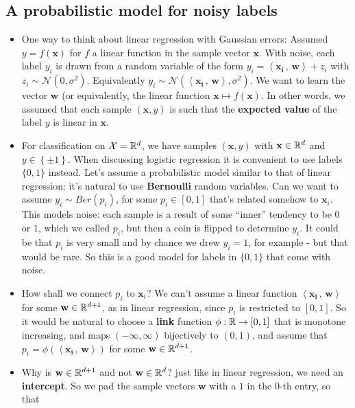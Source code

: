 \documentclass[11pt]{article}
\newcommand{\Nc}{\mathcal{N}}
\newcommand{\innerr}[2]{{\left\langle #1\,,\,#2 \right\rangle}}
\newcommand{\VV}[1]{\mathbf{#1}}
\begin{document}
\subsection{A probabilistic model for noisy labels}
\begin{itemize}
  \item One way to think about linear regression with Gaussian errors: 
    Assumed $y=f(\VV{x})$ for $f$ a linear function in the sample vector $\VV{x}$.
    With noise, each label $y_i$ is drawn from a random variable of the form
    $y_i = \innerr{\VV{x_i}}{\VV{w}}  + z_i$ with $z_i \sim \Nc(0,\sigma^2)$.
    Equivalently
    $y_i \sim \mathcal{N}( \innerr{\VV{x_i}}{\VV{w}} , \sigma^2)$. 
    We want to learn the vector $\VV{w}$ (or equivalently, the linear function
      $\VV{x}\mapsto f(\VV{x})$. 
      In other words, we assumed that each sample $(\VV{x},y)$ is such that
      the {\bf expected value} of the label $y$ is
      linear in $\VV{x}$. 
    \item For classification on $\mathcal{X}=\mathbb{R}^d$, we have samples $(\VV{x},y)$ with
      $\VV{x}\in\reals^d$ and $y\in\left\{ \pm 1 \right\}$. When discussing
      logistic regression it is convenient to use labels $\{0,1\}$ instead. 
      Let's assume a probabilistic model similar to that of linear regression:
      it's natural to use {\bf Bernoulli} random variables. Can we want to assume 
      $y_i \sim Ber(p_i)$, for some $p_i\in[0,1]$ that's related somehow to
      $\VV{x}_i$. This models noise: each sample is a result of some ``inner''
      tendency to be $0$ or $1$, which we called $p_i$, but then a coin is
      flipped to determine $y_i$. It could be that $p_i$ is very small and by
      chance we drew $y_i=1$, for example - but that would be rare. So this is a
      good model for labels in $\{0,1\}$ that come with noise.  
    \item How shall we connect $p_i$ to $\VV{x}_i$? We can't assume a linear
      function $\innerr{\VV{x_i}}{\VV{w}}$ for some $\VV{w}\in \reals^{d+1}$, as in linear regression, since $p_i$ is
      restricted to $[0,1]$. So it would be natural to choose a {\bf link}
      function $\phi:\mathbb{R}\to[0,1]$ that is monotone increasing, and maps
      $(-\infty,\infty)$ bijectively to $(0,1)$,  and assume
      that $p_i = \phi (\innerr{\VV{x_i}}{\VV{w}} ) $ for some
      $\VV{w}\in\reals^{d+1}$.  
    \item 	Why is $\VV{w}\in\reals^{d+1}$ and not  $\VV{w}\in\reals^{d}$?
	just like in linear regression, we need an {\bf intercept}. So we pad
	the sample vectors $\VV{w}$ with a $1$ in the $0$-th entry, so that 

\end{itemize}
\end{document}
